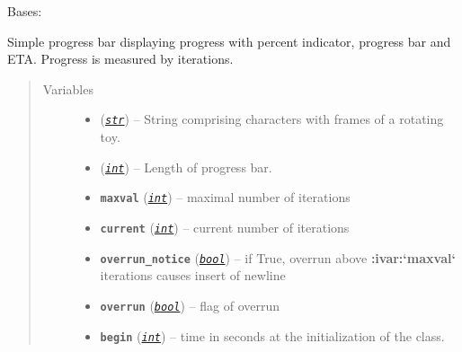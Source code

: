 \documentclass[a4paper,10pt,english]{sphinxmanual}
\begin{document}
\begin{fulllineitems}
\label{aqueduct.utils.log:aqueduct.utils.log.SimpleProgressBar}
Bases: \href{http://docs.python.org/2/library/functions.html\#object}{}

Simple progress bar displaying progress with percent indicator, progress bar and ETA.
Progress is measured by iterations.
\begin{quote}\begin{description}
\item[{Variables}] \leavevmode\begin{itemize}
\item {} 
{\hyperref[aqueduct.utils.log:aqueduct.utils.log.SimpleProgressBar.rotate]{}} (\href{http://docs.python.org/2/library/functions.html\#str}{\emph{\texttt{str}}}) -- String comprising characters with frames of a rotating toy.

\item {} 
{\hyperref[aqueduct.utils.log:aqueduct.utils.log.SimpleProgressBar.barlenght]{}} (\href{http://docs.python.org/2/library/functions.html\#int}{\emph{\texttt{int}}}) -- Length of progress bar.

\item {} 
\textbf{\texttt{maxval}} (\href{http://docs.python.org/2/library/functions.html\#int}{\emph{\texttt{int}}}) -- maximal number of iterations

\item {} 
\textbf{\texttt{current}} (\href{http://docs.python.org/2/library/functions.html\#int}{\emph{\texttt{int}}}) -- current number of iterations

\item {} 
\textbf{\texttt{overrun\_notice}} (\href{http://docs.python.org/2/library/functions.html\#bool}{\emph{\texttt{bool}}}) -- if True, overrun above {\color{red}\bfseries{}:ivar:{}`maxval{}`} iterations causes insert of newline

\item {} 
\textbf{\texttt{overrun}} (\href{http://docs.python.org/2/library/functions.html\#bool}{\emph{\texttt{bool}}}) -- flag of overrun

\item {} 
\textbf{\texttt{begin}} (\href{http://docs.python.org/2/library/functions.html\#int}{\emph{\texttt{int}}}) -- time in seconds at the initialization of the {\hyperref[aqueduct.utils.log:aqueduct.utils.log.SimpleProgressBar]{}} class.


\end{itemize}
\end{description}
\end{quote}
\end{fulllineitems}
\end{document}
